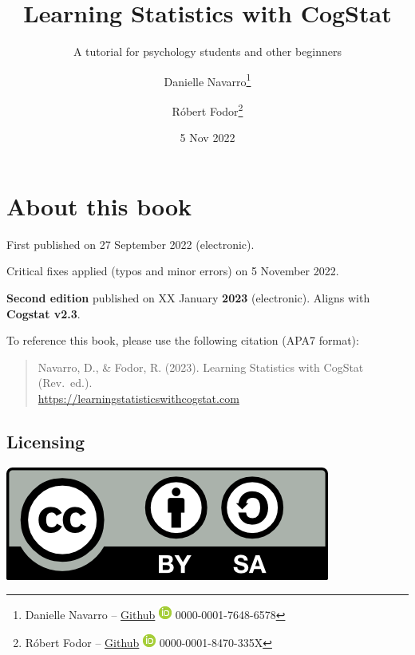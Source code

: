 \documentclass[
  11pt,
]{book}
\title{Learning Statistics with CogStat}
\subtitle{A tutorial for psychology students and other beginners}
\author{Danielle Navarro\footnote{Danielle Navarro -- \href{https://github.com/djnavarro/}{Github} \textbar{} \href{https://orcid.org/0000-0001-7648-6578}{\includegraphics{resources/image/orcid_16x16.png}} 0000-0001-7648-6578} \and Róbert Fodor\footnote{Róbert Fodor -- \href{https://github.com/robertfodor/}{Github} \textbar{} \href{https://orcid.org/0000-0001-8470-335X}{\includegraphics{resources/image/orcid_16x16.png}} 0000-0001-8470-335X}}
\date{5 Nov 2022}
\let\oldmaketitle\maketitle
\theoremstyle{definition}
\theoremstyle{definition}
\theoremstyle{definition}
\theoremstyle{definition}
\theoremstyle{remark}
\begin{document}
\maketitle

\frontmatter
{} %

\newpage
\let\maketitle\oldmaketitle
\maketitle
{} %
\setcounter{page}{1}

\mainmatter
{}

{
\hypersetup{linkcolor=black}
\setcounter{tocdepth}{1}
\tableofcontents
}
\hypertarget{about-this-book}{%
\chapter*{About this book}\label{about-this-book}}

First published on 27 September 2022 (electronic).

Critical fixes applied (typos and minor errors) on 5 November 2022.

\textbf{Second edition} published on XX January \textbf{2023} (electronic). Aligns with \textbf{Cogstat v2.3}.

To reference this book, please use the following citation (APA7 format):

\begin{quote}
Navarro, D., \& Fodor, R. (2023). Learning Statistics with CogStat (Rev.~ed.).\\
\url{https://learningstatisticswithcogstat.com}
\end{quote}

\hypertarget{licensing}{%
\section*{Licensing}\label{licensing}}

\includegraphics[width=0.66\linewidth]{resources/image/by-sa}
\end{document}
